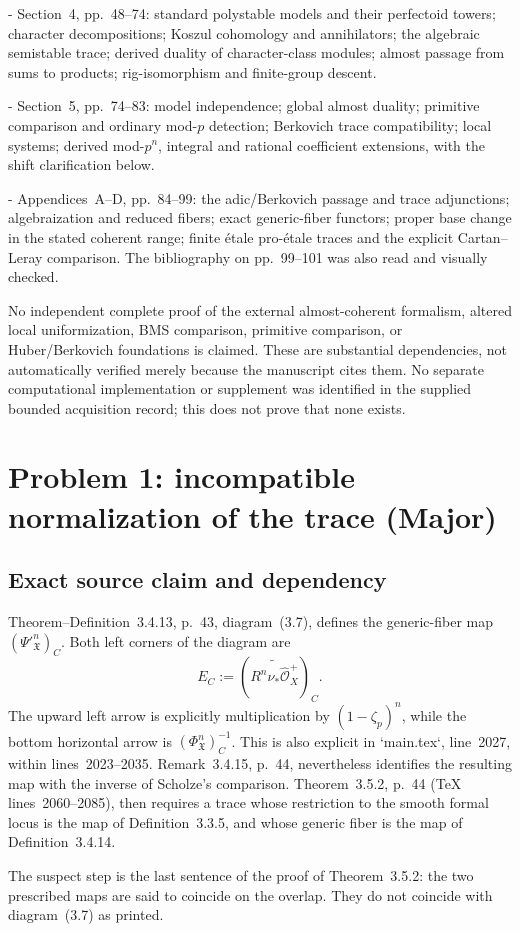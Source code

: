 \documentclass[10pt]{article}
\begin{document}
- Section 4, pp. 48–74: standard polystable models and their perfectoid towers; character decompositions; Koszul cohomology and annihilators; the algebraic semistable trace; derived duality of character-class modules; almost passage from sums to products; rig-isomorphism and finite-group descent.\par
- Section 5, pp. 74–83: model independence; global almost duality; primitive comparison and ordinary mod-\(p\) detection; Berkovich trace compatibility; local systems; derived mod-\(p^n\), integral and rational coefficient extensions, with the shift clarification below.\par
- Appendices A–D, pp. 84–99: the adic/Berkovich passage and trace adjunctions; algebraization and reduced fibers; exact generic-fiber functors; proper base change in the stated coherent range; finite étale pro-étale traces and the explicit Cartan–Leray comparison. The bibliography on pp. 99–101 was also read and visually checked.\par
No independent complete proof of the external almost-coherent formalism, altered local uniformization, BMS comparison, primitive comparison, or Huber/Berkovich foundations is claimed. These are substantial dependencies, not automatically verified merely because the manuscript cites them. No separate computational implementation or supplement was identified in the supplied bounded acquisition record; this does not prove that none exists.\par
\section*{Problem 1: incompatible normalization of the trace (Major)}
\subsection*{Exact source claim and dependency}
Theorem–Definition 3.4.13, p. 43, diagram (3.7), defines the generic-fiber map \((\Psi'^n_{\mathfrak X})_C\). Both left corners of the diagram are \[E_C:=\left(\widetilde{R^n\nu_*\widehat{\mathcal O}_X^+}\right)_C .\] The upward left arrow is explicitly multiplication by \((1-\zeta_p)^n\), while the bottom horizontal arrow is \((\Phi^n_{\mathfrak X})_C^{-1}\). This is also explicit in `main.tex`, line 2027, within lines 2023–2035. Remark 3.4.15, p. 44, nevertheless identifies the resulting map with the inverse of Scholze’s comparison. Theorem 3.5.2, p. 44 (TeX lines 2060–2085), then requires a trace whose restriction to the smooth formal locus is the map of Definition 3.3.5, and whose generic fiber is the map of Definition 3.4.14.\par
The suspect step is the last sentence of the proof of Theorem 3.5.2: the two prescribed maps are said to coincide on the overlap. They do not coincide with diagram (3.7) as printed.\par
\end{document}
